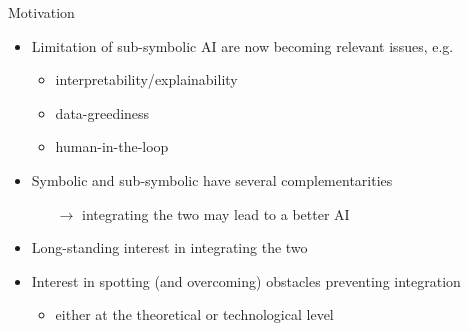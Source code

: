\documentclass[presentation]{beamer}\mode<presentation>{\usetheme{AMSBolognaFC}}
\begin{document}
\begin{frame}{Motivation}
    \begin{itemize}
        \item \alert{Limitation} of sub-symbolic AI are now becoming relevant \alert{issues}, e.g.
        \begin{itemize}
            \item interpretability/\alert{explainability}
            \item data-greediness
            \item human-in-the-loop
        \end{itemize}
        
        \vfill

        \item Symbolic and sub-symbolic have several \alert{complementarities}
        \begin{itemize}
            \item[$\rightarrow$] integrating the two may lead to a better AI
        \end{itemize}

        \vfill

        \item Long-standing interest in \alert{integrating} the two

        \vfill

        \item Interest in spotting (and overcoming) \alert{obstacles} preventing integration
        \begin{itemize}
            \item either at the theoretical or technological level
        \end{itemize}
    \end{itemize}
\end{frame}
\end{document}
